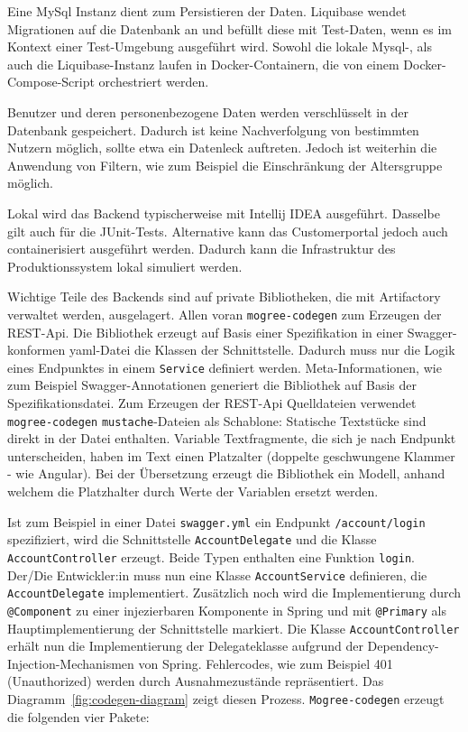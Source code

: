 Eine MySql Instanz dient zum Persistieren der Daten. Liquibase wendet Migrationen auf die Datenbank an und befüllt diese mit Test-Daten, wenn es im Kontext einer Test-Umgebung ausgeführt wird. Sowohl die lokale Mysql-, als auch die Liquibase-Instanz laufen in Docker-Containern, die von einem Docker-Compose-Script orchestriert werden.

Benutzer und deren personenbezogene Daten werden verschlüsselt in der Datenbank gespeichert. Dadurch ist keine Nachverfolgung von bestimmten Nutzern möglich, sollte etwa ein Datenleck auftreten. Jedoch ist weiterhin die Anwendung von Filtern, wie zum Beispiel die Einschränkung der Altersgruppe möglich. 

Lokal wird das Backend typischerweise mit Intellij IDEA ausgeführt. Dasselbe gilt auch für die JUnit-Tests. Alternative kann das Customerportal jedoch auch containerisiert ausgeführt werden. Dadurch kann die Infrastruktur des Produktionssystem lokal simuliert werden.

Wichtige Teile des Backends sind auf private Bibliotheken, die mit Artifactory verwaltet werden, ausgelagert. Allen voran \texttt{mogree-codegen} zum Erzeugen der REST-Api. Die Bibliothek erzeugt auf Basis einer Spezifikation in einer Swagger-konformen yaml-Datei die Klassen der Schnittstelle. Dadurch muss nur die Logik eines Endpunktes in einem \texttt{Service} definiert werden. Meta-Informationen, wie zum Beispiel Swagger-Annotationen generiert die Bibliothek auf Basis der Spezifikationsdatei. Zum Erzeugen der REST-Api Quelldateien verwendet \texttt{mogree-codegen} \texttt{mustache}-Dateien als Schablone: Statische Textstücke sind direkt in der Datei enthalten. Variable Textfragmente, die sich je nach Endpunkt unterscheiden, haben im Text einen Platzalter (doppelte geschwungene Klammer - wie Angular). Bei der Übersetzung erzeugt die Bibliothek ein Modell, anhand welchem die Platzhalter durch Werte der Variablen ersetzt werden.

Ist zum Beispiel in einer Datei \texttt{swagger.yml} ein Endpunkt \texttt{/account/login} spezifiziert, wird die Schnittstelle \texttt{AccountDelegate} und die Klasse \texttt{AccountController} erzeugt. Beide Typen enthalten eine Funktion \texttt{login}. Der/Die Entwickler:in muss nun eine Klasse \texttt{AccountService} definieren, die \texttt{AccountDelegate} implementiert. Zusätzlich noch wird die Implementierung durch \texttt{@Component} zu einer injezierbaren Komponente in Spring und mit \texttt{@Primary} als Hauptimplementierung der Schnittstelle markiert. Die Klasse \texttt{AccountController} erhält nun die Implementierung der Delegateklasse aufgrund der Dependency-Injection-Mechanismen von Spring. Fehlercodes, wie zum Beispiel 401 (Unauthorized) werden durch Ausnahmezustände repräsentiert. Das Diagramm~\autoref{fig:codegen-diagram} zeigt diesen Prozess. \texttt{Mogree-codegen} erzeugt die folgenden vier Pakete:

